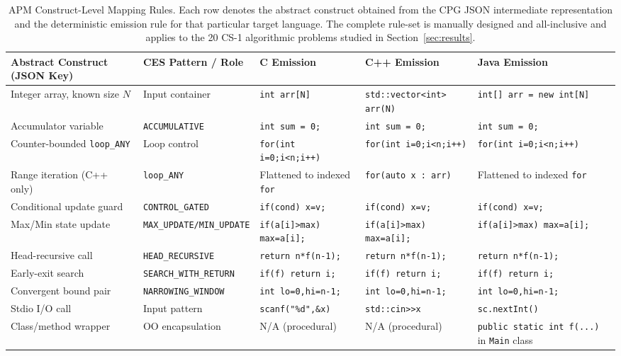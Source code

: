 \begin{table}[tp]
\caption{APM Construct-Level Mapping Rules. Each row denotes the abstract construct obtained from the CPG JSON intermediate representation and the deterministic emission rule for that particular target language. The complete rule-set is manually designed and all-inclusive and applies to the 20 CS-1 algorithmic problems studied in Section~\ref{sec:results}.}
\label{tab:apm_mapping}
\centering
\begin{tabular}{|p{2.8cm}|p{3.5cm}|p{3.0cm}|p{3.0cm}|p{3.0cm}|}
\hline
\textbf{Abstract Construct (JSON Key)} & \textbf{CES Pattern / Role} & \textbf{C Emission} & \textbf{C++ Emission} & \textbf{Java Emission} \\
\hline
Integer array, known size $N$ & Input container & \texttt{int arr[N]} & \texttt{std::vector<int> arr(N)} & \texttt{int[] arr = new int[N]} \\
\hline
Accumulator variable & \texttt{ACCUMULATIVE} & \texttt{int sum = 0;} & \texttt{int sum = 0;} & \texttt{int sum = 0;} \\
\hline
Counter-bounded \texttt{loop\_ANY} & Loop control & \texttt{for(int i=0;i<n;i++)} & \texttt{for(int i=0;i<n;i++)} & \texttt{for(int i=0;i<n;i++)} \\
\hline
Range iteration (C++ only) & \texttt{loop\_ANY} & Flattened to indexed \texttt{for} & \texttt{for(auto x : arr)} & Flattened to indexed \texttt{for} \\
\hline
Conditional update guard & \texttt{CONTROL\_GATED} & \texttt{if(cond) x=v;} & \texttt{if(cond) x=v;} & \texttt{if(cond) x=v;} \\
\hline
Max/Min state update & \texttt{MAX\_UPDATE/MIN\_UPDATE} & \texttt{if(a[i]>max) max=a[i];} & \texttt{if(a[i]>max) max=a[i];} & \texttt{if(a[i]>max) max=a[i];} \\
\hline
Head-recursive call & \texttt{HEAD\_RECURSIVE} & \texttt{return n*f(n-1);} & \texttt{return n*f(n-1);} & \texttt{return n*f(n-1);} \\
\hline
Early-exit search & \texttt{SEARCH\_WITH\_RETURN} & \texttt{if(f) return i;} & \texttt{if(f) return i;} & \texttt{if(f) return i;} \\
\hline
Convergent bound pair & \texttt{NARROWING\_WINDOW} & \texttt{int lo=0,hi=n-1;} & \texttt{int lo=0,hi=n-1;} & \texttt{int lo=0,hi=n-1;} \\
\hline
Stdio I/O call & Input pattern & \texttt{scanf("\%d",\&x)} & \texttt{std::cin>>x} & \texttt{sc.nextInt()} \\
\hline
Class/method wrapper & OO encapsulation & N/A (procedural) & N/A (procedural) & \texttt{public static int f(...)} in \texttt{Main} class \\
\hline
\end{tabular}
\end{table}
